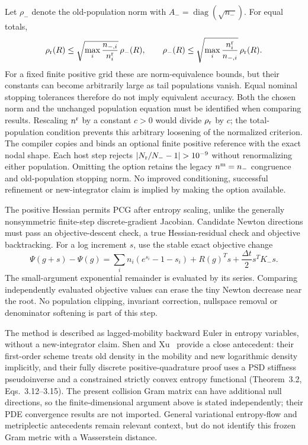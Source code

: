 \documentclass[11pt,letterpaper]{article}
\newcommand{\diag}{\operatorname{diag}}
\begin{document}
Let $\rho_-$ denote the old-population norm with $A_-=\diag(\sqrt{n_-})$.
For equal totals,
\[
 \rho_{\rm r}(R)\le
 \sqrt{\max_i\frac{n_{-,i}}{n_i^{\rm r}}}\,\rho_-(R),\qquad
 \rho_-(R)\le
 \sqrt{\max_i\frac{n_i^{\rm r}}{n_{-,i}}}\,\rho_{\rm r}(R).
\]
For a fixed finite positive grid these are norm-equivalence bounds, but
their constants can become arbitrarily large as tail populations vanish.
Equal nominal stopping tolerances therefore do not imply equivalent accuracy.
Both the chosen norm and the unchanged population equation must be identified
when comparing results. Rescaling $n^{\rm r}$ by a constant $c>0$ would divide
$\rho_{\rm r}$ by $c$; the total-population condition prevents this arbitrary
loosening of the normalized criterion. The compiler copies and binds an
optional finite positive reference with the exact nodal shape. Each host step
rejects $|N_{\rm r}/N_- -1|>10^{-9}$ without renormalizing either population.
Omitting the option retains the legacy $n^{\rm m}=n_-$ congruence and
old-population stopping norm. No improved conditioning, successful refinement
or new-integrator claim is implied by making the option available.

The positive Hessian permits PCG after entropy scaling, unlike the generally
nonsymmetric finite-step discrete-gradient Jacobian. Candidate Newton
directions must pass an objective-descent check, a true Hessian-residual
check and objective backtracking. For a log increment $s$, use the stable
exact objective change
\begin{equation}
 \Psi(g+s)-\Psi(g)=\sum_i n_i(e^{s_i}-1-s_i)
                   +R(g)^Ts+\frac{\Delta t}{2}s^TK_-s.
\end{equation}
The small-argument exponential remainder is evaluated by its series.
Comparing independently evaluated objective values can erase the tiny
Newton decrease near the root. No population clipping, invariant correction,
nullspace removal or denominator softening is part of this step.

The method is described as lagged-mobility backward Euler in entropy
variables, without a new-integrator claim. Shen and Xu~\cite{SX21} provide
a close antecedent: their first-order scheme treats old density in the
mobility and new logarithmic density implicitly, and their fully discrete
positive-quadrature proof uses a PSD stiffness pseudoinverse and a constrained
strictly convex entropy functional (Theorem~3.2, Eqs.~3.12--3.15).
The present collision Gram matrix can have additional null directions, so
the finite-dimensional argument above is stated independently; their PDE
convergence results are not imported. General variational entropy-flow and
metriplectic antecedents remain relevant context, but do not identify this
frozen Gram metric with a Wasserstein distance.
\end{document}
